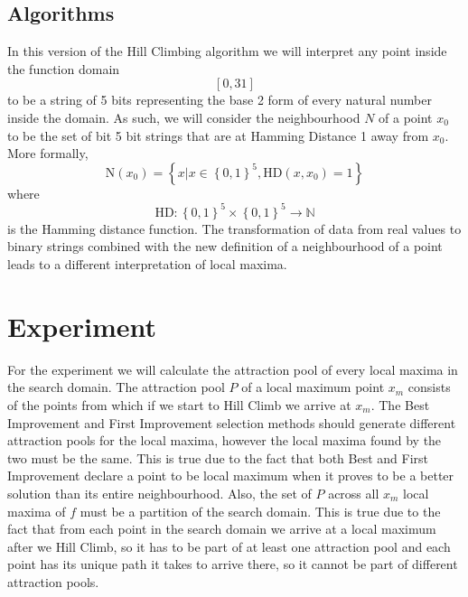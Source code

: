 \documentclass{article}
\begin{document}

\subsection{Algorithms}
In this version of the Hill Climbing algorithm we will interpret any point inside the function domain $$\left[0, 31 \right]$$ to be a string of 5 bits representing the base 2 form of every natural number inside the domain. As such, we will consider the neighbourhood $N$ of a point $x_0$  to be the set of bit 5 bit strings that are at Hamming Distance 1 away from $x_0$. More formally, 
$$ \text{N}\left(x_0\right) = \left\{x | x \in \left\{0, 1\right\}^5, \text{HD}(x, x_0) = 1\right\}$$
where
$$\text{HD}:\left\{0, 1\right\}^5 \times \left\{0, 1\right\}^5 \to \mathbb{N}$$
 is the Hamming distance function.
The transformation of data from real values to binary strings combined with the new definition of a neighbourhood of a point leads to a different interpretation of local maxima. 


\section {Experiment}
For the experiment we will calculate the attraction pool of every local maxima in the search domain. The attraction pool $P$ of a local maximum point $x_m$ consists of the points from which if we start to Hill Climb we arrive at $x_m$. The Best Improvement and First Improvement selection methods should generate different attraction pools for the local maxima, however the local maxima found by the two must be the same. This is true due to the fact that both Best and First Improvement declare a point to be local maximum when it proves to be a better solution than its entire neighbourhood. Also, the set of $P$ across all $x_m$ local maxima of $f$ must be a partition of the search domain. This is true due to the fact that from each point in the search domain we arrive at a local maximum after we Hill Climb, so it has to be part of at least one attraction pool and each point has its unique path it takes to arrive there, so it cannot be part of different attraction pools.
\end{document}
